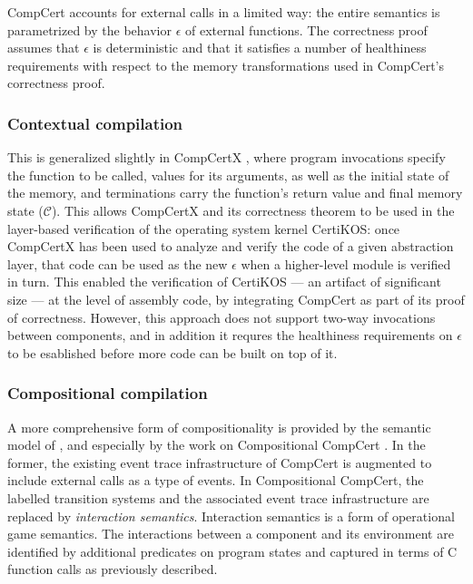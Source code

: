 \documentclass[sigplan,10pt,review,anonymous]{acmart}
\begin{document}
CompCert accounts for external calls
in a limited way:
the entire semantics is parametrized by
the behavior $\epsilon$ of external functions.
The correctness proof assumes that $\epsilon$ is deterministic
and that it satisfies a number of healthiness requirements
with respect to the memory transformations
used in CompCert's correctness proof.


\subsubsection{Contextual compilation} %

This is generalized slightly in CompCertX \cite{popl15},
where program invocations specify
the function to be called,
values for its arguments,
as well as the initial state of the memory,
and terminations carry
the function's return value and final memory state
($\mathcal{C}$).
This allows CompCertX and its correctness theorem
to be used in the layer-based verification of
the operating system kernel CertiKOS:
once CompCertX has been used to
analyze and verify the code of a given abstraction layer,
that code can be used as the new $\epsilon$
when a higher-level module is verified in turn.
This enabled the verification of CertiKOS ---
an artifact of significant size ---
at the level of assembly code,
by integrating CompCert as part of its proof of correctness.
However,
this approach does not support two-way invocations between components,
and in addition
it requres the healthiness requirements on $\epsilon$
to be esablished before
more code can be built on top of it.


\subsubsection{Compositional compilation} %

A more comprehensive form of compositionality
is provided by
the semantic model of \cite{cpp15},
and especially by
the work on Compositional CompCert \cite{compcompcert}.
In the former,
the existing event trace infrastructure of CompCert
is augmented to include external calls as a type of events.
In Compositional CompCert,
the labelled transition systems and the associated
event trace infrastructure are replaced by
\emph{interaction semantics}.
Interaction semantics is a form of operational game semantics.
The interactions between a component and its environment
are identified by additional predicates on program states and
captured in terms of C function calls as previously described.
\end{document}
